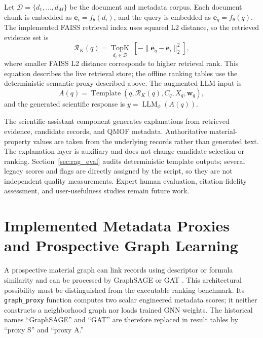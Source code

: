 \documentclass[12pt,a4paper]{article}
\begin{document}
Let $\mathcal{D} = \{d_1, \ldots, d_M\}$ be the document and metadata corpus. Each document chunk is embedded as $\mathbf{e}_i = f_\theta(d_i)$, and the query is embedded as $\mathbf{e}_q = f_\theta(q)$. The implemented FAISS retrieval index uses squared L2 distance, so the retrieved evidence set is
\begin{equation}
  \mathcal{R}_K(q) = \underset{d_i\in\mathcal{D}}{\operatorname{TopK}}\;[-\|\mathbf{e}_q-\mathbf{e}_i\|_2^2],
\end{equation}
where smaller FAISS L2 distance corresponds to higher retrieval rank. This equation describes the live retrieval store; the offline ranking tables use the deterministic semantic proxy described above.
The augmented LLM input is
\begin{equation}
  A(q) = \operatorname{Template}(q, \mathcal{R}_K(q), C_q, X_q, \mathbf{w}_q),
\end{equation}
and the generated scientific response is $y = \operatorname{LLM}_\phi(A(q))$.

The scientific-assistant component generates explanations from retrieved evidence, candidate records, and QMOF metadata. Authoritative material-property values are taken from the underlying records rather than generated text. The explanation layer is auxiliary and does not change candidate selection or ranking. Section~\ref{sec:rag_eval} audits deterministic template outputs; several legacy scores and flags are directly assigned by the script, so they are not independent quality measurements. Expert human evaluation, citation-fidelity assessment, and user-usefulness studies remain future work.

\section{Implemented Metadata Proxies and Prospective Graph Learning}
\label{sec:graph}

A prospective material graph can link records using descriptor or formula similarity and can be processed by GraphSAGE or GAT \cite{hamilton2017,velickovic2018}. This architectural possibility must be distinguished from the executable ranking benchmark. Its \texttt{graph\_proxy} function computes two scalar engineered metadata scores; it neither constructs a neighborhood graph nor loads trained GNN weights. The historical names ``GraphSAGE'' and ``GAT'' are therefore replaced in result tables by ``proxy S'' and ``proxy A.''
\end{document}
